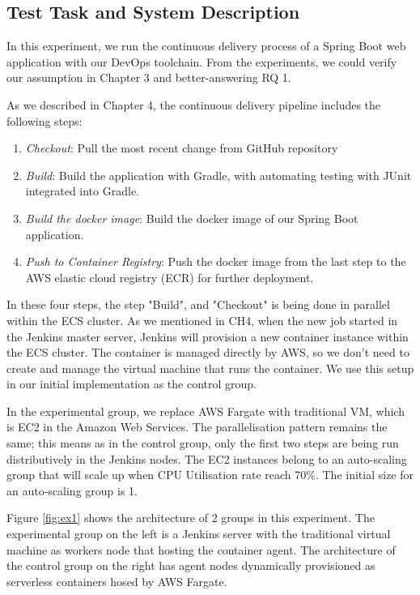 \subsection{Test Task and System Description}
In this experiment, we run the continuous delivery process of a Spring Boot web application with our DevOps toolchain. From the experiments, we could verify our assumption in Chapter 3 and better-answering RQ 1.
\par
As we described in Chapter 4, the continuous delivery pipeline includes the following steps:
\begin{enumerate}
\item \textit{Checkout}: Pull the most recent change from GitHub repository
\item \textit{Build}: Build the application with Gradle, with automating testing with JUnit integrated into Gradle.
\item \textit{Build the docker image}: Build the docker image of our Spring Boot application.
\item \textit{Push to Container Registry}: Push the docker image from the last step to the AWS elastic cloud registry (ECR) for further deployment.
\end{enumerate}
\par
In these four steps, the step "Build", and "Checkout" is being done in parallel within the ECS cluster. As we mentioned in CH4, when the new job started in the Jenkins master server, Jenkins will provision a new container instance within the ECS cluster. The container is managed directly by AWS, so we don't need to create and manage the virtual machine that runs the container. We use this setup in our initial implementation as the control group.
\par
In the experimental group, we replace AWS Fargate with traditional VM, which is EC2 in the Amazon Web Services. The parallelisation pattern remains the same; this means as in the control group, only the first two steps are being run distributively in the Jenkins nodes. The EC2 instances belong to an auto-scaling group that will scale up when CPU Utilisation rate reach 70\%. The initial size for an auto-scaling group is 1.
\par
Figure \ref{fig:ex1} shows the architecture of 2 groups in this experiment. The experimental group on the left is a Jenkins server with the traditional virtual machine as workers node that hosting the container agent. The architecture of the control group on the right has agent nodes dynamically provisioned as serverless containers hosed by AWS Fargate.
